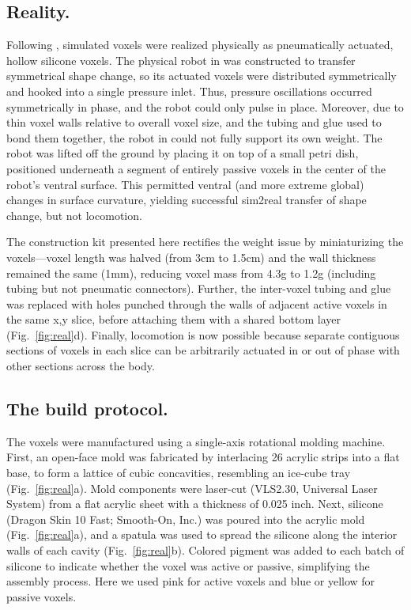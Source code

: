 
\subsection*{Reality.}


Following \citet{kriegman2019automated}, simulated voxels were realized physically as pneumatically actuated, hollow silicone voxels.
The physical robot in \cite{kriegman2019automated} was constructed to transfer symmetrical shape change, so its actuated voxels were distributed symmetrically and hooked into a single pressure inlet.
Thus, pressure oscillations occurred symmetrically in phase, and the robot could only pulse in place.
Moreover, due to thin voxel walls relative to overall voxel size, and the tubing and glue used to bond them together, the robot in \cite{kriegman2019automated} could not fully support its own weight.
The robot was lifted off the ground by placing it on top of a small petri dish, positioned underneath a segment of entirely passive voxels in the center of the robot's ventral surface.
This permitted ventral (and more extreme global) changes in surface curvature, yielding successful sim2real transfer of shape change, 
but not locomotion.


The construction kit presented here rectifies the weight issue by miniaturizing the voxels---voxel length was halved (from 3cm to 1.5cm) and the wall thickness remained the same (1mm), reducing voxel mass from 4.3g to 1.2g (including tubing but not pneumatic connectors).
Further, the inter-voxel tubing and glue was replaced with holes punched through the walls of adjacent active voxels in the same x,y slice, before attaching them with a shared bottom layer (Fig.~\ref{fig:real}d).
Finally, locomotion is now possible because separate contiguous sections of voxels in each slice can be arbitrarily actuated in or out of phase with other sections across the body.





\subsection*{The build protocol.}


The voxels were manufactured using a single-axis rotational molding machine.
First, an open-face mold was fabricated by interlacing 26 acrylic strips into a flat base, to form a lattice of cubic concavities, resembling an ice-cube tray (Fig.~\ref{fig:real}a). Mold components were laser-cut (VLS2.30, Universal Laser System) from a flat acrylic sheet with a thickness of 0.025 inch.
Next, silicone (Dragon Skin 10 Fast; Smooth-On, Inc.) was poured into the acrylic mold (Fig.~\ref{fig:real}a), and a spatula was used to spread the silicone along the interior walls of each cavity (Fig.~\ref{fig:real}b). Colored pigment was added to each batch of silicone to indicate whether the voxel was active or passive, simplifying the assembly process. Here we used pink for active voxels and blue or yellow for passive voxels.

